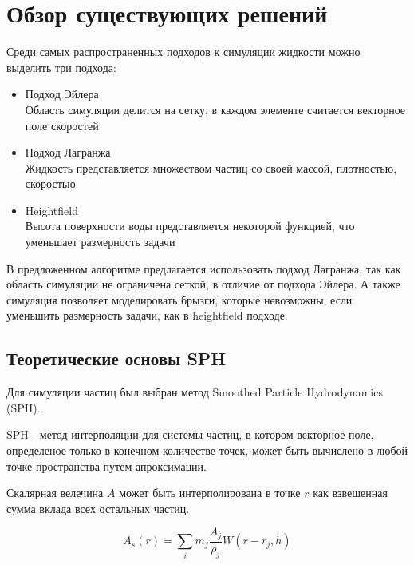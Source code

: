 \chapter{Обзор существующих решений} \label{ch2}



Среди самых распространенных подходов к симуляции жидкости можно выделить три
подхода:
\begin{itemize}
	\item Подход Эйлера\\
	      Область симуляции делится на сетку, в каждом элементе считается векторное
	      поле скоростей
	\item Подход Лагранжа\\
	      Жидкость представляется множеством частиц со своей массой, плотностью,
	      скоростью
	\item Heightfield\\
	      Высота поверхности воды представляется некоторой функцией, что уменьшает
	      размерность задачи
\end{itemize}

В предложенном алгоритме предлагается использовать подход Лагранжа, так как
область симуляции не ограничена сеткой, в отличие от подхода Эйлера. А также
симуляция позволяет моделировать брызги, которые невозможны, если уменьшить
размерность задачи, как в heightfield подходе.


\section{Теоретические основы SPH} \label{ch2:sec-abbr} %

Для симуляции частиц был выбран метод Smoothed Particle Hydrodynamics (SPH).

SPH - метод интерполяции для системы частиц, в котором векторное поле,
определеное только в конечном количестве точек, может быть вычислено в любой
точке пространства путем апроксимации.

Скалярная велечина $A$ может быть интерполирована в точке $r$ как взвешенная
сумма вклада всех остальных частиц.

\begin{equation}
	A_s(r) = \sum_i m_j \frac{A_j}{\rho_j} W(r - r_j, h)
\end{equation}

